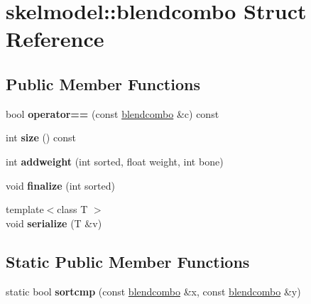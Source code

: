 \hypertarget{structskelmodel_1_1blendcombo}{}\section{skelmodel\+:\+:blendcombo Struct Reference}
\label{structskelmodel_1_1blendcombo}
\subsection*{Public Member Functions}
\begin{DoxyCompactItemize}
\item 
\mbox{\label{structskelmodel_1_1blendcombo_a7b0384dfb361effb7583bd7ce4a1d386}} 
bool {\bfseries operator==} (const \hyperlink{structskelmodel_1_1blendcombo}{blendcombo} \&c) const
\item 
\mbox{\label{structskelmodel_1_1blendcombo_ae07369bfe9fa0d4b547530ed3a7b2b1d}} 
int {\bfseries size} () const
\item 
\mbox{\label{structskelmodel_1_1blendcombo_a75c55f2ecf9fd744dd3126fd50ae8537}} 
int {\bfseries addweight} (int sorted, float weight, int bone)
\item 
\mbox{\label{structskelmodel_1_1blendcombo_a18da71f5729c63cbd1599731ebba038c}} 
void {\bfseries finalize} (int sorted)
\item 
\mbox{\label{structskelmodel_1_1blendcombo_a3defb7b60da7b5c2f76997678f51e5e4}} 
{\footnotesize template$<$class T $>$ }\\void {\bfseries serialize} (T \&v)
\end{DoxyCompactItemize}
\subsection*{Static Public Member Functions}
\begin{DoxyCompactItemize}
\item 
\mbox{\label{structskelmodel_1_1blendcombo_a6a56dd18955aefd8efbb562d506bca06}} 
static bool {\bfseries sortcmp} (const \hyperlink{structskelmodel_1_1blendcombo}{blendcombo} \&x, const \hyperlink{structskelmodel_1_1blendcombo}{blendcombo} \&y)
\end{DoxyCompactItemize}
